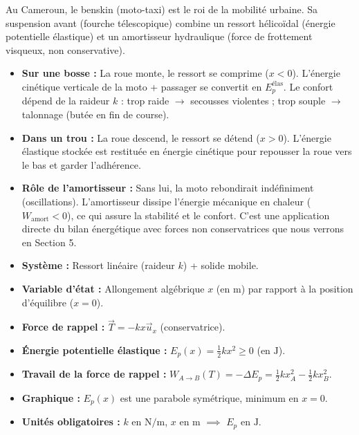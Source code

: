 \documentclass[11pt]{article}
\newcommand{\cle}[1]{{\popxbold\color{popdark}#1}}
\newcounter{popsec}
\newcounter{popsub}
\newcommand{\courssub}[1]{%
  \stepcounter{popsub}%
  \par\vspace{9pt}\noindent{\popxbold\fontsize{11.5}{13}\selectfont\color{popink}{\color{poporange}\thepopsec.\thepopsub}\hspace{6pt}#1}\par\nopagebreak\vspace{4pt}
}
\begin{document}
\begin{savaistu}
Au Cameroun, le \cle{benskin} (moto-taxi) est le roi de la mobilité urbaine. Sa suspension avant (fourche télescopique) combine un ressort hélicoïdal (énergie potentielle élastique) et un amortisseur hydraulique (force de frottement visqueux, non conservative).
\begin{itemize}
    \item \textbf{Sur une bosse :} La roue monte, le ressort se comprime ($x<0$). L'énergie cinétique verticale de la moto + passager se convertit en $E_p^{\text{élas}}$. Le confort dépend de la raideur $k$ : trop raide $\to$ secousses violentes ; trop souple $\to$ \guillemotleft talonnage \guillemotright (butée en fin de course).
    \item \textbf{Dans un trou :} La roue descend, le ressort se détend ($x>0$). L'énergie élastique stockée est restituée en énergie cinétique pour repousser la roue vers le bas et garder l'adhérence.
    \item \textbf{Rôle de l'amortisseur :} Sans lui, la moto rebondirait indéfiniment (oscillations). L'amortisseur dissipe l'énergie mécanique en chaleur ($W_{\text{amort}} < 0$), ce qui assure la \cle{stabilité} et le \cle{confort}. C'est une application directe du bilan énergétique avec forces non conservatrices que nous verrons en Section 5.
\end{itemize}
\end{savaistu}

\courssub{Bilan de la section}

\begin{aretenir}
\begin{itemize}
    \item \textbf{Système :} Ressort linéaire (raideur $k$) + solide mobile.
    \item \textbf{Variable d'état :} Allongement algébrique $x$ (en $\si{\meter}$) par rapport à la position d'équilibre ($x=0$).
    \item \textbf{Force de rappel :} $\vec{T} = -k x \vec{u}_x$ (conservatrice).
    \item \textbf{Énergie potentielle élastique :} $\displaystyle E_p(x) = \frac{1}{2} k x^2 \ge 0$ (en $\si{\joule}$).
    \item \textbf{Travail de la force de rappel :} $W_{A \to B}(T) = -\Delta E_p = \frac{1}{2}k x_A^2 - \frac{1}{2}k x_B^2$.
    \item \textbf{Graphique :} $E_p(x)$ est une parabole symétrique, minimum en $x=0$.
    \item \textbf{Unités obligatoires :} $k$ en $\si{\newton\per\meter}$, $x$ en $\si{\meter}$ $\implies$ $E_p$ en $\si{\joule}$.
\end{itemize}
\end{aretenir}
\end{document}
